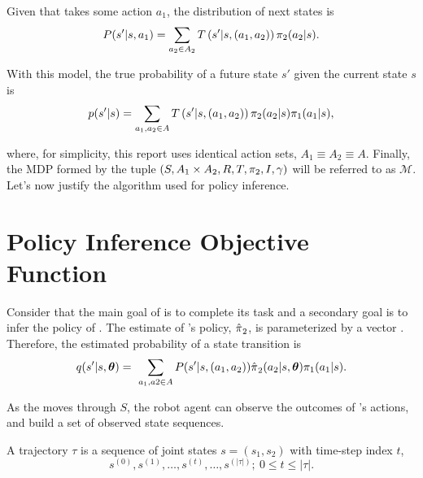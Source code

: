    Given that  takes some action $a_1$, the distribution of next states is
    \begin{equation}\label{eq:true_state_action_trans_prob}
        P(s'| s, a_1) = \sum_{a_2\in A_2} T\left(s'|s, (a_1,a_2)\right)\pi_{2}(a_2|s).
    \end{equation}

    \noindent
    With this model, the true probability of a future state $s'$ given the current state $s$ is
    \begin{equation}\label{eq:true_state_trans_prob}
        p(s'|s) = \sum_{a_1, a_2 \in A} T \left(s'|s, (a_1,a_2)\right)\pi_{2}(a_2|s)\pi_{1}(a_1|s),
    \end{equation}

    \noindent
    where, for simplicity, this report uses identical action sets, $A_1 \equiv A_2 \equiv A$. Finally, the \ac{MDP}
    formed by the tuple $(S, A_1 \times A_2, R, T, \pi_{2}, I , \gamma)$ will be referred to as $\mathcal{M}$. Let's
    now justify the algorithm used for policy inference.



\section{Policy Inference Objective Function}\label{sec:policy_obj}
    Consider that the main goal of  is to complete its task and a secondary goal is to infer the policy of
    . The estimate of 's policy, $\hat{\pi_{}}_2$, is parameterized by a vector \vect{\theta}.
    Therefore, the estimated probability of a state transition is
    \begin{equation}\label{eq:est_state_trans_prob}
        q(s'|s, \boldsymbol{\mathbb{\theta}}) = \
            \sum_{a_1, a2 \in A}P(s'|s,(a_1,a_2))\hat{\pi_{}}_2(a_2|s,\boldsymbol{\mathbb{\theta}})\pi_{1}(a_1|s).
    \end{equation}

    As the  moves through $S$, the robot agent can observe the outcomes of 's actions, and build a set
    of observed state sequences.
    \begin{definition}\label{def:traj}
        A trajectory $\tau$ is a sequence of joint states $s=(s_1, s_2)$ with time-step index $t$,
        \[
        s^{(0)}, s^{(1)}, \ldots , s^{(t)}, \ldots , s^{(|\tau|)};\ 0 \leq t \leq |\tau|.
        \]
    \end{definition}

